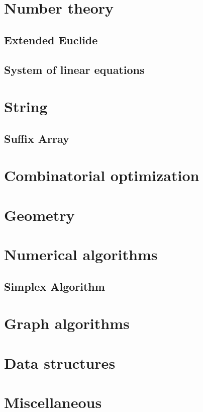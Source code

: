 \section{Number theory}
\subsection{Extended Euclide}
\raggedbottom
\hrulefill
\subsection{System of linear equations}
\raggedbottom
\hrulefill

\section{String}
\subsection{Suffix Array}
\raggedbottom
\hrulefill

\section{Combinatorial optimization}

\section{Geometry}

\section{Numerical algorithms}
\subsection{Simplex Algorithm}
\raggedbottom
\hrulefill

\section{Graph algorithms}

\section{Data structures}

\section{Miscellaneous}

